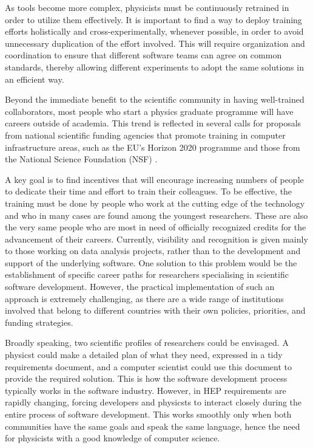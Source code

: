 \documentclass[12pt,a4paper]{article}
\begin{document}
As tools become more complex, physicists must be continuously retrained in order
to utilize them effectively. It is important to find a way to deploy training efforts
holistically and cross-experimentally, whenever possible, in order to avoid unnecessary 
duplication of the effort involved. This will require organization and coordination to
ensure that different software teams can agree on common standards, thereby allowing different
experiments to adopt the same solutions in an efficient way. 

Beyond the immediate benefit to the scientific community in having well-trained
collaborators, most people who start a physics graduate programme will have
careers outside of academia. This trend is reflected in several calls for
proposals from national scientific funding agencies that promote training in computer
infrastructure areas, such as the EU's Horizon 2020 programme and those from
the National Science Foundation (NSF) \cite{NSF1,NSF2}.

A key goal is to find incentives that will encourage 
increasing numbers of people to dedicate their time and effort to train their
colleagues.
To be effective, the training must be done by people who work at the cutting
edge of the technology and who in many cases are found among the youngest
researchers. These are also the very same people who are most in need of
officially recognized credits for the advancement of their careers. Currently,
visibility and recognition is given mainly to those working on data analysis
projects, rather than to the development and support of the underlying
software. One solution to this problem would be the establishment of specific
career paths for researchers specialising in scientific software development. 
However, the practical 
implementation of such an approach is extremely challenging, as there are a wide range of
institutions involved that belong to different countries with their own
policies, priorities, and funding strategies. 

Broadly speaking, two scientific profiles of researchers could be
envisaged. A physicst could make a detailed plan of what they need, expressed 
in a tidy requirements document, and a computer scientist could use this document 
to provide the required solution. This is how the software development process 
typically works in the software industry. However, in HEP requirements are rapidly
changing, forcing developers and physicsts to interact closely during the entire
process of software development. This works smoothly only when both communities
have the same goals and speak the same language, hence the need for physicists with a good
knowledge of computer science.
\end{document}
